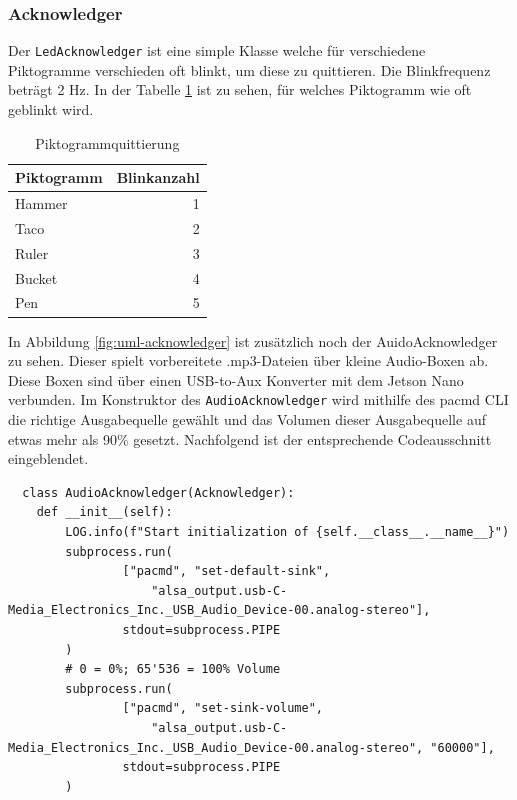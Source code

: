  \subsubsection{Acknowledger}
 Der \texttt{LedAcknowledger} ist eine simple Klasse welche für verschiedene Piktogramme verschieden oft blinkt, um diese zu quittieren. Die Blinkfrequenz beträgt 2 Hz. In der Tabelle \ref{tab:piktogrammquittierung} ist zu sehen, für welches Piktogramm wie oft geblinkt wird.
 
\begin{center}
\begin{table}[H]
\begin{tabular}{|l|r|}
\hline
\textbf {Piktogramm} & \textbf{Blinkanzahl} \\
\hline
Hammer & 1 \\
\hline
Taco & 2 \\
\hline
Ruler & 3 \\
\hline
Bucket & 4 \\
\hline
Pen & 5 \\
\hline
\end{tabular}
\caption[Piktogrammquittierung]{Piktogrammquittierung}
\label{tab:piktogrammquittierung}
\end{table}
\end{center}

In Abbildung \ref{fig:uml-acknowledger} ist zusätzlich noch der AuidoAcknowledger zu sehen. Dieser spielt vorbereitete .mp3-Dateien über kleine Audio-Boxen ab. Diese Boxen sind über einen USB-to-Aux Konverter mit dem Jetson Nano verbunden. Im Konstruktor des \texttt{AudioAcknowledger} wird mithilfe des pacmd CLI \cite{pacmd} die richtige Ausgabequelle gewählt und das Volumen dieser Ausgabequelle auf etwas mehr als 90\% gesetzt. Nachfolgend ist der entsprechende Codeausschnitt eingeblendet.

\begin{verbatim}
  class AudioAcknowledger(Acknowledger):
    def __init__(self):
        LOG.info(f"Start initialization of {self.__class__.__name__}")
        subprocess.run(
                ["pacmd", "set-default-sink", 
                    "alsa_output.usb-C-Media_Electronics_Inc._USB_Audio_Device-00.analog-stereo"],
                stdout=subprocess.PIPE
        )
        # 0 = 0%; 65'536 = 100% Volume
        subprocess.run(
                ["pacmd", "set-sink-volume",
                    "alsa_output.usb-C-Media_Electronics_Inc._USB_Audio_Device-00.analog-stereo", "60000"],
                stdout=subprocess.PIPE
        )
 \end{verbatim}

